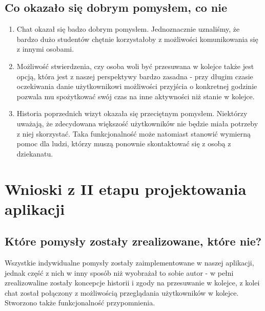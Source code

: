 \documentclass[12pt]{article}
\begin{document}
\subsection{Co okazało się dobrym pomysłem, co nie}
\begin {enumerate}
	\item Chat okazał się badzo dobrym pomysłem. Jednoznacznie uznaliśmy, że bardzo dużo studentów chętnie korzystałoby z możliwości komunikowania się z innymi osobami.
	
	\item Możliwość stwierdzenia, czy osoba woli być przesuwana w kolejce także jest opcją, która jest z naszej perspektywy bardzo zasadna - przy długim czasie oczekiwania danie użytkownikowi możliwości przyjścia o konkretnej godzinie pozwala mu spożytkować swój czas na inne aktywności niż stanie w kolejce.
	
	\item Historia poprzednich wizyt okazała się przeciętnym pomysłem. Niektórzy uważają, że zdecydowana większość użytkowników nie będzie miała potrzeby z niej skorzystać. Taka funkcjonalność może natomiast stanowić wymierną pomoc dla ludzi, którzy muszą ponownie skontaktować się z osobą z dziekanatu.
	
\end {enumerate}

\section {Wnioski z II etapu projektowania aplikacji}
\subsection {Które pomysły zostały zrealizowane, które nie?}

Wszystkie indywidualne pomysły zostały zaimplementowane w naszej aplikacji, jednak część z nich w inny sposób niż wyobrażał to sobie autor - w pełni zrealizowaline zostały koncepcje historii i zgody na przesuwanie w kolejce, z kolei chat został połączony z możliwością przeglądania użytkowników w kolejce. Stworzono także funkcjonalność przypomnienia.
\end{document}

